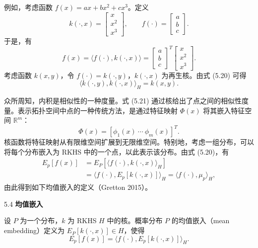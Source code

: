 例如，考虑函数 $f(x)=ax+bx^2+cx^3$。定义
\[
k(\cdot,x)=\begin{bmatrix}x\\x^2\\x^3\end{bmatrix},\qquad
f(\cdot)=\begin{bmatrix}a\\b\\c\end{bmatrix}.
\]
于是，有
\[
f(x)=\langle f(\cdot),k(\cdot,x)\rangle
=\begin{bmatrix}a\\b\\c\end{bmatrix}^{\!T}
\begin{bmatrix}x\\x^2\\x^3\end{bmatrix}.
\]
考虑函数 $k(x,y)$，令 $f(\cdot)=k(\cdot,y)$，$k(\cdot,x)$ 为再生核。由式 (5.20) 可得
\begin{equation}
\langle k(\cdot,y),k(\cdot,x)\rangle_H=k(x,y).
\tag{5.21}
\end{equation}

众所周知，内积是相似性的一种度量。式 (5.21) 通过核给出了点之间的相似性度量。表示拓扑空间中点的一种传统方法，是通过特征映射 $\Phi(x)$ 将其嵌入特征空间 $\mathbb R^m$：
\[
\Phi(x)=[\phi_1(x)\ \cdots\ \phi_m(x)]^T.
\]
核函数将特征映射从有限维空间扩展到无限维空间。特别地，考虑一组分布，可以将每个分布嵌入为 RKHS 中的一个点，以此表示该分布。由式 (5.20)，有
\begin{equation}
\begin{aligned}
E_p[f(x)]
&=E_P[\langle f(\cdot),k(\cdot,x)\rangle_H]\\
&=\langle f(\cdot),E_p[k(\cdot,x)]\rangle_H
=\langle f(\cdot),\mu_p\rangle_H,
\end{aligned}
\tag{5.22}
\end{equation}
由此得到如下均值嵌入的定义（Gretton 2015）。

\begin{bookdefinition}{5.4}
\textbf{均值嵌入}

设 $P$ 为一个分布，$k$ 为 RKHS $H$ 中的核。概率分布 $P$ 的均值嵌入（mean embedding）定义为 $E_P[k(\cdot,x)]\in H$，使得
\begin{equation}
E_p[f(x)]=\langle f(\cdot),E_p[k(\cdot,x)]\rangle_H.
\tag{5.23}
\end{equation}
\end{bookdefinition}

